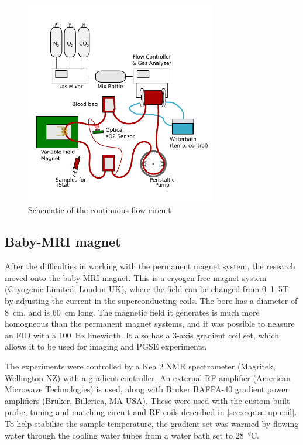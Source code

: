 \begin{figure}[t]
\centering
\includegraphics[width=0.75\textwidth]{figures/exptsetup/contflowschematic.pdf}
\caption{Schematic of the continuous flow circuit}
\label{fig:exptsetup-contflow-schematic}
\end{figure}

\subsection{Baby-MRI magnet}
After the difficulties in working with the permanent magnet system, the research moved onto the baby-MRI magnet.
This is a cryogen-free magnet system (Cryogenic Limited, London UK), where the field can be changed from \SI{0}{1.5}{T} by adjusting the current in the superconducting coils.
The bore has a diameter of \SI{8}{cm}, and is \SI{60}{cm} long.
The magnetic field it generates is much more homogneous than the permanent magnet systems, and it was possible to neasure an FID with a \SI{100}{Hz} linewidth.
It also has a 3-axis gradient coil set, which allows it to be used for imaging and PGSE experiments.

The experiments were controlled by a Kea 2 NMR spectrometer (Magritek, Wellington NZ) with a gradient controller.
An external RF amplifier (American Microwave Technologies) is used, along with Bruker BAFPA-40 gradient power amplifiers (Bruker, Billerica, MA USA).
These were used with the custom built probe, tuning and matching circuit and RF coils described in \autoref{sec:exptsetup-coil}.
To help stabilise the sample temperature, the gradient set was warmed by flowing water through the cooling water tubes from a water bath set to \SI{28}{\celsius}.

